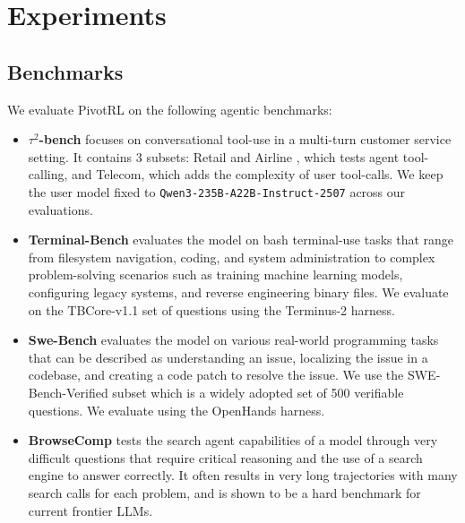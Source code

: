 \section{Experiments}
\label{sec:experiments}



\subsection{Benchmarks}
We evaluate PivotRL on the following agentic benchmarks:
\begin{itemize}
  \item \textbf{$\tau^2$-bench} \citep{barres2025tau2bench} focuses on conversational tool-use in a multi-turn customer service setting. It contains 3 subsets: Retail and Airline \citep{yao2024taubench}, which tests agent tool-calling, and Telecom, which adds the complexity of user tool-calls. We keep the user model fixed to \texttt{Qwen3-235B-A22B-Instruct-2507} across our evaluations.
  \item \textbf{Terminal-Bench} \citep{tbench_2025} evaluates the model on bash terminal-use tasks that range from filesystem navigation, coding, and system administration to complex problem-solving scenarios such as training machine learning models, configuring legacy systems, and reverse engineering binary files. We evaluate on the TBCore-v1.1 set of questions using the Terminus-2 harness.
  \item \textbf{Swe-Bench} \citep{jimenez2024swebench} evaluates the model on various real-world programming tasks that can be described as understanding an issue, localizing the issue in a codebase, and creating a code patch to resolve the issue. We use the SWE-Bench-Verified subset which is a widely adopted set of 500 verifiable questions. We evaluate using the OpenHands harness. 
  \item \textbf{BrowseComp}
  \citep{wei2025browsecompsimplechallengingbenchmark} tests the search agent capabilities of a model through very difficult questions that require critical reasoning and the use of a search engine to answer correctly. It often results in very long trajectories with many search calls for each problem, and is shown to be a hard benchmark for current frontier LLMs.
\end{itemize}

